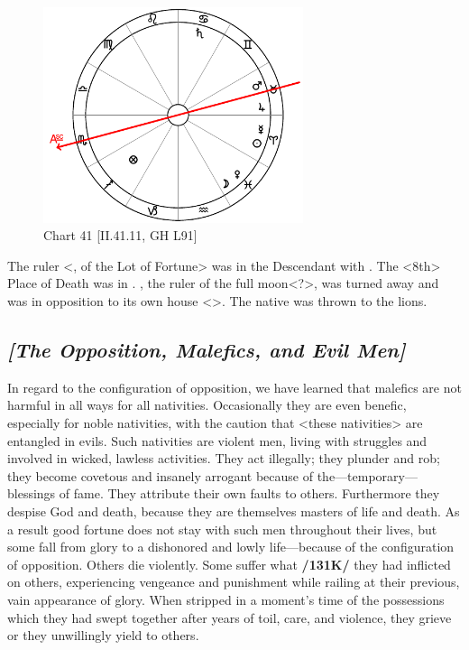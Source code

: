 \clearpage
\begin{figure}
\centering
\vspace{-20pt}
\includegraphics[width=0.68\textwidth]{charts/2_41_11}
\caption{Chart 41 [II.41.11, GH L91]}
\label{fig:chart41}
\end{figure} 

The ruler <\Jupiter, of the Lot of Fortune> was in the Descendant with \Mars. The <8th> Place of Death was in \Cancer. \Saturn, the ruler of the full moon<?>, was turned away and \Mars\xspace was in opposition to its own house <\Scorpio>. The native was thrown to the lions.
\newpage
\subsection{\textit{[The Opposition, Malefics, and Evil Men]}}
In \mnmb regard to the configuration of opposition, we have learned that malefics are not harmful in all ways for all nativities. Occasionally they are even benefic, especially for noble nativities, with the caution that <these nativities> are entangled in evils. Such nativities are violent men, living with struggles and involved in wicked, lawless activities. They act illegally; they plunder and rob; they become covetous and insanely arrogant because of the—temporary—blessings of fame. They attribute their own faults to others. Furthermore they despise God and death, because they are themselves masters of life and death. As a result good fortune does not stay with such men throughout their lives, but some fall from glory to a dishonored and lowly life—because of the configuration of opposition. Others die violently. Some suffer what \textbf{/131K/} they had inflicted on others, experiencing vengeance and punishment while railing at their previous, vain appearance of glory. When stripped in a moment’s time of the possessions which they had swept together
after years of toil, care, and violence, they grieve or they unwillingly yield to others. 

